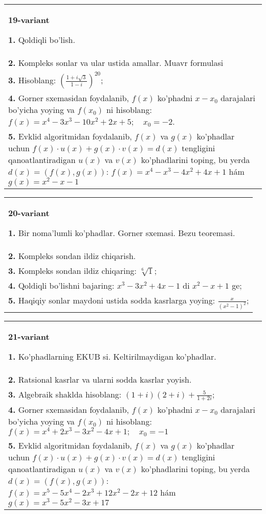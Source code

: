 \documentclass{article}
\begin{document}
\begin{tabular}{m{17cm}}
\textbf{19-variant}
\newline

\textbf{1.} Qoldiqli bo’lish.  \\
\textbf{2.} Kompleks sonlar va ular ustida amallar. Muavr formulasi  \\
\textbf{3.} Hisoblang:  $\left(\frac{1+i \sqrt{3}}{1-i}\right)^{20}$; \\
\textbf{4.} Gorner sxemasidan foydalanib, $f(x)$ ko’phadni $x-x_0$ darajalari bo’yicha yoying va $f\left(x_0\right)$ ni hisoblang: $f(x)=x^4-3 x^3-10 x^2+2 x+5 ; \quad x_0=-2$. \\
\textbf{5.} Evklid algoritmidan foydalanib, $f(x)$ va $g(x)$ ko’phadlar uchun $f(x) \cdot u(x)+g(x) \cdot v(x)=d(x)$ tengligini qanoatlantiradigan $u(x)$ va $v(x)$ ko’phadlarini toping, bu yerda $d(x)=(f(x), g(x))$:  $f(x)=x^4-x^3-4 x^2+4 x+1$ hám $g(x)=x^2-x-1$ \\

\end{tabular}
\vspace{1cm}


\begin{tabular}{m{17cm}}
\textbf{20-variant}
\newline

\textbf{1.} Bir noma’lumli ko’phadlar. Gorner sxemasi. Bezu teoremasi.  \\
\textbf{2.} Kompleks sondan ildiz chiqarish. \\
\textbf{3.} Kompleks sondan ildiz chiqaring: $\sqrt[6]{1}$; \\
\textbf{4.} Qoldiqli bo’lishni bajaring:  $x^3-3 x^2+4 x-1$ di $x^2-x+1$ ge; \\
\textbf{5.} Haqiqiy sonlar maydoni ustida sodda kasrlarga yoying:  $\frac{x}{\left(x^2-1\right)^2}$; \\

\end{tabular}
\vspace{1cm}


\begin{tabular}{m{17cm}}
\textbf{21-variant}
\newline

\textbf{1.} Ko’phadlarning EKUB si. Keltirilmaydigan ko’phadlar. \\
\textbf{2.} Ratsional kasrlar va ularni sodda kasrlar yoyish. \\
\textbf{3.} Algebraik shaklda hisoblang:  $(1+i)(2+i)+\frac{5}{1+2 i}$; \\
\textbf{4.} Gorner sxemasidan foydalanib, $f(x)$ ko’phadni $x-x_0$ darajalari bo’yicha yoying va $f\left(x_0\right)$ ni hisoblang: $f(x)=x^4+2 x^3-3 x^2-4 x+1 ; \quad x_0=-1$ \\
\textbf{5.} Evklid algoritmidan foydalanib, $f(x)$ va $g(x)$ ko’phadlar uchun $f(x) \cdot u(x)+g(x) \cdot v(x)=d(x)$ tengligini qanoatlantiradigan $u(x)$ va $v(x)$ ko’phadlarini toping, bu yerda $d(x)=(f(x), g(x))$:  $f(x)=x^5-5 x^4-2 x^3+12 x^2-2 x+12$ hám $g(x)=x^3-5 x^2-3 x+17$ \\

\end{tabular}
\vspace{1cm}
\end{document}
